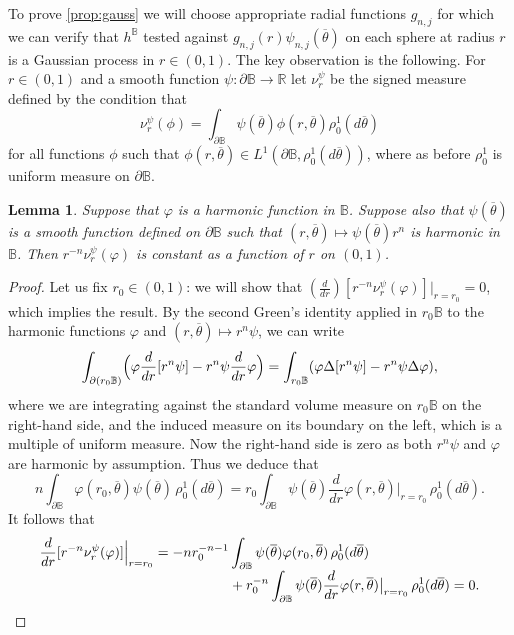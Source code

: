 \documentclass[10pt]{amsart}
\newtheorem{lemma}[theorem]{Lemma}
\theoremstyle{definition}
\newcommand{\R}{\mathbb{R}}
\newcommand{\B}{\mathbb{B}}\let\D\B\let\Ub\B
\let\ol\overline
\begin{document}
To prove \cref{prop:gauss} we will choose appropriate radial functions $g_{n,j}$ for which we can verify that $h^\B$ tested against $ g_{n,j}(r)\psi_{n,j}(\ol{\theta})$ on each sphere at radius $r$ is a Gaussian process in $r\in(0,1)$. The key observation is the following. For $r\in (0,1)$ and a smooth function $\psi: \partial \Ub \to \R$ let $\nu^\psi_r$ be the signed measure defined by the condition that
\begin{equation}\label{eq:av}
\nu^\psi_r(\phi)=\int_{\partial \Ub} \psi(\ol{\theta}) \phi(r,\ol{\theta}) \rho_0^1(d\ol{\theta})
\end{equation}
for all functions $\phi$ such that $\phi(r,\ol{\theta})\in L^1(\partial \Ub,\rho_0^1(d\ol{\theta}))$, where as before $\rho_0^1$ is uniform measure on $\partial \B$.

\begin{lemma}\label{lem:sin_const}
Suppose that $\varphi$ is a harmonic function in $\Ub$. Suppose also that $\psi(\ol{\theta})$ is a smooth function defined on $\partial \Ub$ such that $(r,\ol{\theta})\mapsto \psi(\ol{\theta})r^{n}$ is harmonic in $\Ub$. Then $r^{-n}\nu^\psi_r(\varphi)$ is constant {as a function of $r$ on $(0,1)$}.
\end{lemma}

\begin{proof}
Let us fix $r_0\in (0,1)$: we will show that $(\frac{d}{dr})[r^{-n}\nu_{r}^\psi(\varphi)]|_{r=r_0}=0$, which implies the result. By the second Green's identity applied in $r_0\Ub$ to the harmonic functions $\varphi$ and $(r,\ol{\theta})\mapsto r^n\psi$, we can write
\[
\int_{\partial (r_0\Ub)}\Bigl(\varphi\frac{d}{dr}[r^n\psi] - r^n\psi\frac{d}{dr}\varphi \Bigr) = \int_{r_0 \Ub} (\varphi \Delta[ r^n\psi] - r^n\psi \Delta \varphi),
\]
where we are integrating against the standard volume measure on $r_0\B$ on the right-hand side, and the induced measure on its boundary on the left, which is a multiple of uniform measure.
Now the right-hand side is zero as both $r^n\psi$ and $\varphi$ are harmonic by assumption. Thus we deduce that
\[
n\int_{\partial \Ub}\varphi(r_0,\ol{\theta})\psi(\ol{\theta}) \, \rho_0^1(d\ol{\theta})= r_0\int_{\partial \Ub}\psi(\ol{\theta})\frac{d}{dr}\varphi(r,\ol{\theta})\big|_{r=r_0} \, \rho_0^1(d\ol{\theta}).
\]
It follows that
\begin{align*}
\frac{d}{dr}[r^{-n}\nu^\psi_r(\varphi)]\Big|_{r=r_0}
= -nr_0^{-n-1}&\int_{\partial \Ub}\psi(\ol{\theta}) \varphi(r_0,\ol{\theta})\, \rho_0^1(d\ol{\theta})\\[-3pt]
&+ r_0^{-n}\int_{\partial \Ub}\psi(\ol{\theta})\frac{d}{dr}\varphi(r,\ol\theta)\big|_{r=r_0}\, \rho_0^1(d\ol{\theta}) = 0.\qedhere
\end{align*}
\end{proof}
\end{document}
